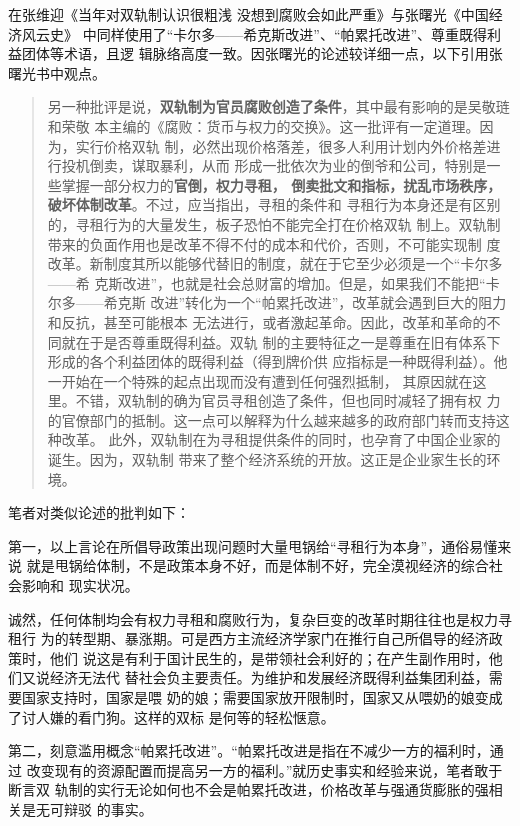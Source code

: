 在张维迎《当年对双轨制认识很粗浅 没想到腐败会如此严重》与张曙光《中国经济风云史》
中同样使用了“卡尔多——希克斯改进”、“帕累托改进”、尊重既得利益团体等术语，且逻
辑脉络高度一致。因张曙光的论述较详细一点，以下引用张曙光书中观点。
\begin{quotation}
  另一种批评是说，\textbf{双轨制为官员腐败创造了条件}，其中最有影响的是吴敬琏和荣敬
  本主编的《腐败：货币与权力的交换》。这一批评有一定道理。因为，实行价格双轨
  制，必然出现价格落差，很多人利用计划内外价格差进行投机倒卖，谋取暴利，从而
  形成一批依次为业的倒爷和公司，特别是一些掌握一部分权力的\textbf{官倒，权力寻租，
    倒卖批文和指标，扰乱市场秩序，破坏体制改革}。不过，应当指出，寻租的条件和
  寻租行为本身还是有区别的，寻租行为的大量发生，板子恐怕不能完全打在价格双轨
  制上。双轨制带来的负面作用也是改革不得不付的成本和代价，否则，不可能实现制
  度改革。新制度其所以能够代替旧的制度，就在于它至少必须是一个“卡尔多——希
  克斯改进”，也就是社会总财富的增加。但是，如果我们不能把“卡尔多——希克斯
  改进”转化为一个“帕累托改进”，改革就会遇到巨大的阻力和反抗，甚至可能根本
  无法进行，或者激起革命。因此，改革和革命的不同就在于是否尊重既得利益。双轨
  制的主要特征之一是尊重在旧有体系下形成的各个利益团体的既得利益（得到牌价供
  应指标是一种既得利益）。他一开始在一个特殊的起点出现而没有遭到任何强烈抵制，
  其原因就在这里。不错，双轨制的确为官员寻租创造了条件，但也同时减轻了拥有权
  力的官僚部门的抵制。这一点可以解释为什么越来越多的政府部门转而支持这种改革。
  此外，双轨制在为寻租提供条件的同时，也孕育了中国企业家的诞生。因为，双轨制
  带来了整个经济系统的开放。这正是企业家生长的环
  境。
\end{quotation}

笔者对类似论述的批判如下：

第一，以上言论在所倡导政策出现问题时大量甩锅给“寻租行为本身”，通俗易懂来说
就是甩锅给体制，不是政策本身不好，而是体制不好，完全漠视经济的综合社会影响和
现实状况。

诚然，任何体制均会有权力寻租和腐败行为，复杂巨变的改革时期往往也是权力寻租行
为的转型期、暴涨期。可是西方主流经济学家门在推行自己所倡导的经济政策时，他们
说这是有利于国计民生的，是带领社会利好的；在产生副作用时，他们又说经济无法代
替社会负主要责任。为维护和发展经济既得利益集团利益，需要国家支持时，国家是喂
奶的娘；需要国家放开限制时，国家又从喂奶的娘变成了讨人嫌的看门狗。这样的双标
是何等的轻松惬意。

第二，刻意滥用概念“帕累托改进”。“帕累托改进是指在不减少一方的福利时，通过
改变现有的资源配置而提高另一方的福利。”就历史事实和经验来说，笔者敢于断言双
轨制的实行无论如何也不会是帕累托改进，价格改革与强通货膨胀的强相关是无可辩驳
的事实。

